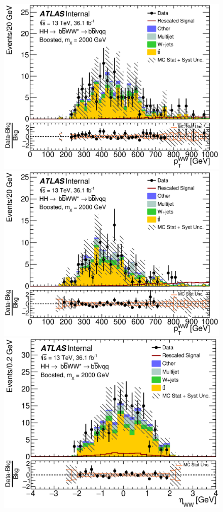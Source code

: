 \begin{figure}[h]
\begin{center}
\includegraphics[scale=0.33]{figures/kinplots/new/C_2tag_SR_elec_presel_met50_WWPt}
\includegraphics[scale=0.33]{figures/kinplots/new/C_2tag_SR_muon_presel_met50_WWPt}\\
\includegraphics[scale=0.33]{figures/kinplots/new/C_2tag_SR_elec_presel_met50_WWEta}

\end{center}
\end{figure}
